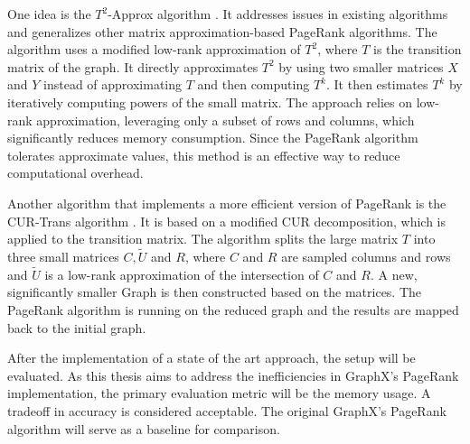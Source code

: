\documentclass[a4paper,12pt]{article}
\begin{document}
One idea is the $T^2$-Approx algorithm \cite{wu_efficient_2024}. It addresses issues in existing algorithms and generalizes other matrix approximation-based PageRank algorithms. The algorithm uses a modified low-rank approximation of $T^2$, where $T$ is the transition matrix of the graph. It directly approximates $T^2$ by using two smaller matrices $X$ and $Y$ instead of approximating $T$ and then computing $T^k$. It then estimates $T^k$ by iteratively computing powers of the small matrix. The approach relies on low-rank approximation, leveraging only a subset of rows and columns, which significantly reduces memory consumption. Since the PageRank algorithm tolerates approximate values, this method is an effective way to reduce computational overhead.

Another algorithm that implements a more efficient version of PageRank is the CUR-Trans algorithm \cite{wu_efficient_2024}. It is based on a modified CUR decomposition, which is applied to the transition matrix. The algorithm splits the large matrix $T$ into three small matrices $C, \tilde{U}$ and $R$, where $C$ and $R$ are sampled columns and rows and $\tilde{U}$ is a low-rank approximation of the intersection of $C$ and $R$. A new, significantly smaller Graph is then constructed based on the matrices. The PageRank algorithm is running on the reduced graph and the results are mapped back to the initial graph.

After the implementation of a state of the art approach, the setup will be evaluated. As this thesis aims to address the inefficiencies in GraphX's PageRank implementation, the primary evaluation metric will be the memory usage. A tradeoff in accuracy is considered acceptable. The original GraphX's PageRank algorithm will serve as a baseline for comparison. 





\end{document}
